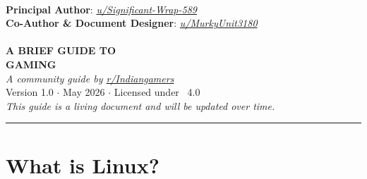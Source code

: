 \documentclass{article}
\begin{document}
 
 \begin{titlepage}

\begin{center}
\hspace{0pt}\\
\vspace{4cm}
{\Large \textbf{Principal Author}: \textit{\href{https://www.reddit.com/u/Significant-Wrap-589/s/LexVz3vvN0}{u/Significant-Wrap-589}}}\\[5pt]
{\Large \textbf{Co-Author \& Document Designer}: \textit{\href{https://www.reddit.com/u/MurkyUnit3180/s/QuyAn31plr}{u/MurkyUnit3180}}}\\[3cm]
{}\\
\vspace{0.8cm}
{\LARGE\bfseries A BRIEF GUIDE TO}\\[10pt]
{\LARGE\bfseries GAMING}\\

\vfill
    {\normalsize\itshape A community guide by \href{https://www.reddit.com/r/Indiangamers}{r/Indiangamers}}\\[4pt]
    {\small Version 1.0 \(\cdot\) May 2026 \(\cdot\) Licensed under \ccbysa~4.0} \\[2pt]
    {\small\textit{This guide is a living document and will be updated over time.}}
\end{center}
\end{titlepage}

\clearpage
{}
{}
\tableofcontents
\vspace{1em} 
\hrule
\clearpage

\section{What is Linux?}
\end{document}
